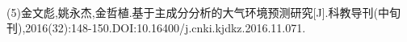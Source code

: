 \documentclass[preview]{standalone}
\begin{document}
\begin{center}
\quad\\(5)金文彪,姚永杰,金哲植.基于主成分分析的大气环境预测研究[J].科教导刊(中旬刊),2016(32):148-150.DOI:10.16400/j.cnki.kjdkz.2016.11.071.\quad\\
\end{center}
\end{document}
